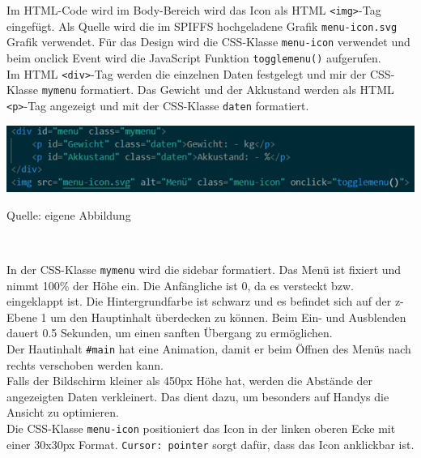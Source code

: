 \documentclass[ngerman,12pt,a4paper]{article}
\begin{document}
	Im HTML-Code wird im Body-Bereich wird das Icon als HTML \texttt{<img>}-Tag eingefügt. Als Quelle wird die im SPIFFS hochgeladene Grafik \texttt{menu-icon.svg} Grafik verwendet. Für das Design wird die CSS-Klasse \texttt{menu-icon} verwendet und beim onclick Event wird die JavaScript Funktion \texttt{togglemenu()} aufgerufen. \\[0.5cm]
	Im HTML \texttt{<div>}-Tag werden die einzelnen Daten festgelegt und mir der CSS-Klasse \texttt{mymenu} formatiert. Das Gewicht und der Akkustand werden als HTML \texttt{<p>}-Tag angezeigt und mit der CSS-Klasse \texttt{daten} formatiert. \\
	\begin{center}
		\begin{minipage}[t]{1\textwidth}
			\includegraphics{Pictures/sensordaten-html}
			\label{fig:sensordaten-html}
			\vspace{-10pt}
			\begin{center}
				\par\small Quelle: eigene Abbildung 
			\end{center}
		\end{minipage} \\[0.75cm]
	\end{center}
	In der CSS-Klasse \texttt{mymenu} wird die sidebar formatiert. Das Menü ist fixiert und nimmt 100\% der Höhe ein. Die Anfängliche ist 0, da es versteckt bzw. eingeklappt ist. Die Hintergrundfarbe ist schwarz und es befindet sich auf der z-Ebene 1 um den Hauptinhalt überdecken zu können. Beim Ein- und Ausblenden dauert 0.5 Sekunden, um einen sanften Übergang zu ermöglichen. \\[0.5cm]
	Der Hautinhalt \texttt{\#main} hat eine Animation, damit er beim Öffnen des Menüs nach rechts verschoben werden kann. \\[0.5cm]
	Falls der Bildschirm kleiner als 450px Höhe hat, werden die Abstände der angezeigten Daten verkleinert. Das dient dazu, um besonders auf Handys die Ansicht zu optimieren. \\[0.5cm]
	Die CSS-Klasse \texttt{menu-icon} positioniert das Icon in der linken oberen Ecke mit einer 30x30px Format. \texttt{Cursor: pointer} sorgt dafür, dass das Icon anklickbar ist. \\[0.5cm]
\end{document}
